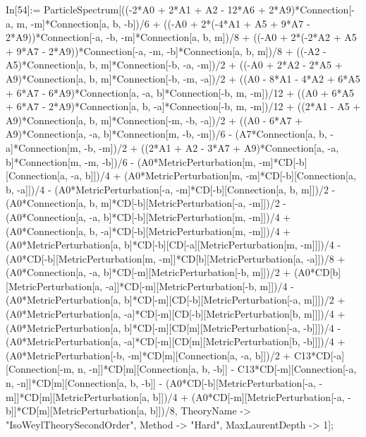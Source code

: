 In[54]:= ParticleSpectrum[((-2*A0 + 2*A1 + A2 - 12*A6 + 2*A9)*Connection[-a, m, -m]*Connection[a, b, -b])/6 + ((-A0 + 2*(-4*A1 + A5 + 9*A7 - 2*A9))*Connection[-a, -b, -m]*Connection[a, b, m])/8 + ((-A0 + 2*(-2*A2 + A5 + 9*A7 - 2*A9))*Connection[-a, -m, -b]*Connection[a, b, m])/8 + ((-A2 - A5)*Connection[a, b, m]*Connection[-b, -a, -m])/2 + ((-A0 + 2*A2 - 2*A5 + A9)*Connection[a, b, m]*Connection[-b, -m, -a])/2 + ((A0 - 8*A1 - 4*A2 + 6*A5 + 6*A7 - 6*A9)*Connection[a, -a, b]*Connection[-b, m, -m])/12 + ((A0 + 6*A5 + 6*A7 - 2*A9)*Connection[a, b, -a]*Connection[-b, m, -m])/12 + ((2*A1 - A5 + A9)*Connection[a, b, m]*Connection[-m, -b, -a])/2 + ((A0 - 6*A7 + A9)*Connection[a, -a, b]*Connection[m, -b, -m])/6 - (A7*Connection[a, b, -a]*Connection[m, -b, -m])/2 + ((2*A1 + A2 - 3*A7 + A9)*Connection[a, -a, b]*Connection[m, -m, -b])/6 - (A0*MetricPerturbation[m, -m]*CD[-b][Connection[a, -a, b]])/4 + (A0*MetricPerturbation[m, -m]*CD[-b][Connection[a, b, -a]])/4 - (A0*MetricPerturbation[-a, -m]*CD[-b][Connection[a, b, m]])/2 - (A0*Connection[a, b, m]*CD[-b][MetricPerturbation[-a, -m]])/2 - (A0*Connection[a, -a, b]*CD[-b][MetricPerturbation[m, -m]])/4 + (A0*Connection[a, b, -a]*CD[-b][MetricPerturbation[m, -m]])/4 + (A0*MetricPerturbation[a, b]*CD[-b][CD[-a][MetricPerturbation[m, -m]]])/4 - (A0*CD[-b][MetricPerturbation[m, -m]]*CD[b][MetricPerturbation[a, -a]])/8 + (A0*Connection[a, -a, b]*CD[-m][MetricPerturbation[-b, m]])/2 + (A0*CD[b][MetricPerturbation[a, -a]]*CD[-m][MetricPerturbation[-b, m]])/4 - (A0*MetricPerturbation[a, b]*CD[-m][CD[-b][MetricPerturbation[-a, m]]])/2 + (A0*MetricPerturbation[a, -a]*CD[-m][CD[-b][MetricPerturbation[b, m]]])/4 + (A0*MetricPerturbation[a, b]*CD[-m][CD[m][MetricPerturbation[-a, -b]]])/4 - (A0*MetricPerturbation[a, -a]*CD[-m][CD[m][MetricPerturbation[b, -b]]])/4 + (A0*MetricPerturbation[-b, -m]*CD[m][Connection[a, -a, b]])/2 + C13*CD[-a][Connection[-m, n, -n]]*CD[m][Connection[a, b, -b]] - C13*CD[-m][Connection[-a, n, -n]]*CD[m][Connection[a, b, -b]] - (A0*CD[-b][MetricPerturbation[-a, -m]]*CD[m][MetricPerturbation[a, b]])/4 + (A0*CD[-m][MetricPerturbation[-a, -b]]*CD[m][MetricPerturbation[a, b]])/8, TheoryName -> "IsoWeylTheorySecondOrder", Method -> "Hard", MaxLaurentDepth -> 1]; 